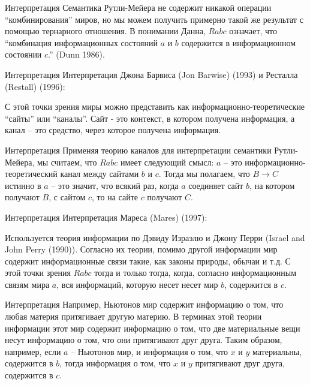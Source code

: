 \documentclass[14pt]{beamer}
\begin{document}
\begin{frame}[nologo]{Интерпретация}
Семантика Рутли-Мейера не содержит никакой операции ``комбинирования'' миров, 
но мы можем получить примерно такой же результат с помощью тернарного 
отношения. В понимании Данна, $ Rabc $ означает, что ``комбинация 
информационных состояний $ a $ и $ b $ содержится в информационном состоянии $ 
c $.'' (Dunn 1986).
\end{frame}

\begin{frame}[nologo]{Интерпретация}
Интерпретация Джона Барвиса (Jon Barwise) (1993) и Ресталла (Restall) (1996):

С этой точки зрения миры можно представить как информационно-теоретические 
``сайты'' или ``каналы''. Сайт - это контекст, в котором получена информация, а 
канал -- это средство, через которое получена информация.
\end{frame}

\begin{frame}[nologo]{Интерпретация}
Применяя теорию каналов для интерпретации семантики Рутли-Мейера, 
мы считаем, что $ Rabc $ имеет следующий смысл: $ a $ -- это 
информационно-теоретический канал между сайтами $ b $ и $ c $. Тогда мы 
полагаем, что $ B \rightarrow C $ истинно в $ a $ -- это значит, что всякий 
раз, когда $ a $ соединяет сайт $ b $, на котором получают $ B $, с сайтом $ c 
$, то на сайте $ c $ получают $ C $.
\end{frame}

\begin{frame}[nologo]{Интерпретация}
Интерпретация Мареса (Mares) (1997):

Используется теория информации по Дэвиду Израэлю и Джону Перри (Israel and John 
Perry (1990)). Согласно их теории, помимо другой информации мир содержит 
информационные связи такие, как законы природы, обычаи и т.д. С этой точки 
зрения $ Rabc $ тогда и только тогда, когда, согласно информационным связям 
мира $ a $, вся информаций, которую несет несет мир $ b $, содержится в $ c $.
\end{frame}

\begin{frame}[nologo]{Интерпретация}
Например, Ньютонов мир содержит информацию о том, что любая материя притягивает 
другую материю. В терминах этой теории информации этот мир содержит информацию 
о том, что две материальные вещи несут информацию о том, что они притягивают 
друг друга. Таким образом, например, если $ a $ -- Ньютонов мир, и 
информация о том, что $ x $ и $ y $ материальны, содержится в $ 
b $, тогда информация о том, что $ x $ и $ y $ притягивают друг друга, 
содержится в $ c $.
\end{frame}
\end{document}
